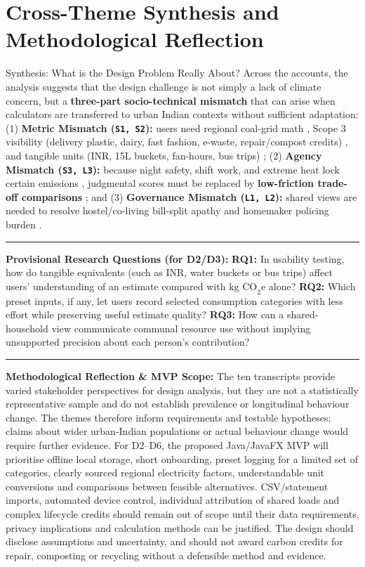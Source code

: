 \documentclass[12pt, a4paper]{article}
\begin{document}
\section{Cross-Theme Synthesis and Methodological Reflection}
\begin{synthesisbox}{Synthesis: What is the Design Problem Really About?}
Across the accounts, the analysis suggests that the design challenge is not simply a lack of climate concern, but a \textbf{three-part socio-technical mismatch} that can arise when calculators are transferred to urban Indian contexts without sufficient adaptation: (1) \textbf{Metric Mismatch (\texttt{S1, S2}):} users need regional coal-grid math \cite{lee2021, cf4}, Scope 3 visibility (delivery plastic, dairy, fast fashion, e-waste, repair/compost credits) \cite{shi2021, koide2019, malan2020, cf1, cf3, cf10}, and tangible units (INR, 15L buckets, fan-hours, bus trips) \cite{cf1, cf6, cf8, grinstein2018, mohanty2023}; (2) \textbf{Agency Mismatch (\texttt{S3, L3}):} because night safety, shift work, and extreme heat lock certain emissions \cite{cf1, cf2, cf9}, judgmental scores must be replaced by \textbf{low-friction trade-off comparisons} \cite{cf5, cf6, brynjarsdottir2012}; and (3) \textbf{Governance Mismatch (\texttt{L1, L2}):} shared views are needed to resolve hostel/co-living bill-split apathy \cite{cf1, cf7, cf10, froehlich2012, tiefenbeck2019} and homemaker policing burden \cite{cf3}.
\vspace{2pt}\hrule\vspace{3pt}
\textbf{Provisional Research Questions (for D2/D3):} \textbf{RQ1:} In usability testing, how do tangible equivalents (such as INR, water buckets or bus trips) affect users' understanding of an estimate compared with $\text{kg CO}_2\text{e}$ alone? \textbf{RQ2:} Which preset inputs, if any, let users record selected consumption categories with less effort while preserving useful estimate quality? \textbf{RQ3:} How can a shared-household view communicate communal resource use without implying unsupported precision about each person's contribution?
\vspace{2pt}\hrule\vspace{3pt}
\textbf{Methodological Reflection \& MVP Scope:} The ten transcripts provide varied stakeholder perspectives for design analysis, but they are not a statistically representative sample and do not establish prevalence or longitudinal behaviour change. The themes therefore inform requirements and testable hypotheses; claims about wider urban-Indian populations or actual behaviour change would require further evidence. For D2--D6, the proposed Java/JavaFX MVP will prioritise offline local storage, short onboarding, preset logging for a limited set of categories, clearly sourced regional electricity factors, understandable unit conversions and comparisons between feasible alternatives. CSV/statement imports, automated device control, individual attribution of shared loads and complex lifecycle credits should remain out of scope until their data requirements, privacy implications and calculation methods can be justified. The design should disclose assumptions and uncertainty, and should not award carbon credits for repair, composting or recycling without a defensible method and evidence.

\end{synthesisbox}
\end{document}
